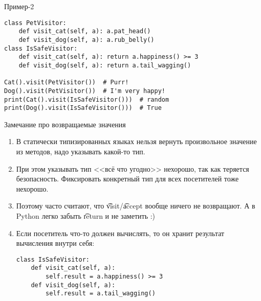 \begin{frame}[fragile]{Пример-2}
\begin{verbatim}
class PetVisitor:
    def visit_cat(self, a): a.pat_head()
    def visit_dog(self, a): a.rub_belly()
class IsSafeVisitor:
    def visit_cat(self, a): return a.happiness() >= 3
    def visit_dog(self, a): return a.tail_wagging()

Cat().visit(PetVisitor())  # Purr!
Dog().visit(PetVisitor())  # I'm very happy!
print(Cat().visit(IsSafeVisitor()))  # random
print(Dog().visit(IsSafeVisitor()))  # True
\end{verbatim}
\end{frame}

\begin{frame}[fragile]{Замечание про возвращаемые значения}
	\begin{enumerate}
		\item
			В статически типизированных языках нельзя вернуть произвольное значение из методов,
			надо указывать какой-то тип.
		\item
			При этом указывать тип <<всё что угодно>> нехорошо, так как теряется безопасность.
			Фиксировать конкретный тип для всех посетителей тоже нехорошо.
		\item
			Поэтому часто считают, что \t{visit}/\t{accept} вообще ничего не возвращают.
			А в Python легко забыть \t{return} и не заметить :)
		\item
			Если посетитель что-то должен вычислять, то он хранит результат вычисления внутри себя:
\begin{verbatim}
class IsSafeVisitor:
    def visit_cat(self, a):
        self.result = a.happiness() >= 3
    def visit_dog(self, a):
        self.result = a.tail_wagging()
\end{verbatim}
	\end{enumerate}
\end{frame}
